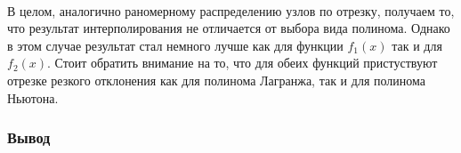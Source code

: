 \documentclass[11pt]{article}
\begin{document}
    \begin{center}
    \end{center}
    { \hspace*{\fill} \\}
    
    \begin{center}
    \end{center}
    { \hspace*{\fill} \\}
    
    \begin{center}
    \end{center}
    { \hspace*{\fill} \\}
    
    \begin{center}
    \end{center}
    { \hspace*{\fill} \\}
    
    \begin{center}
    \end{center}
    { \hspace*{\fill} \\}
    
    \begin{center}
    \end{center}
    { \hspace*{\fill} \\}
    
    В целом, аналогично раномерному распределению узлов по отрезку, получаем
то, что результат интерполирования не отличается от выбора вида
полинома. Однако в этом случае результат стал немного лучше как для
функции \(f_1(x)\) так и для \(f_2(x)\). Стоит обратить внимание на то,
что для обеих функций пристуствуют отрезке резкого отклонения как для
полинома Лагранжа, так и для полинома Ньютона.

    \subsubsection*{Вывод}
\end{document}
